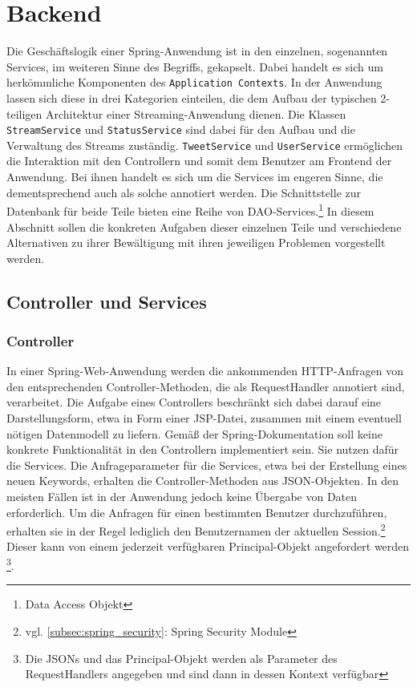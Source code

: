 \section{Backend}

Die Geschäftslogik einer Spring-Anwendung ist in den einzelnen, sogenannten Services, im 
weiteren Sinne des Begriffs, gekapselt. Dabei handelt es sich um herkömmliche Komponenten des 
\texttt{Application Contexts}. In der Anwendung lassen sich diese in drei Kategorien einteilen, 
die dem Aufbau der typischen 2-teiligen Architektur einer Streaming-Anwendung dienen. Die 
Klassen \texttt{StreamService} und \texttt{StatusService} sind dabei für den Aufbau und die 
Verwaltung des Streams zuständig. \texttt{TweetService} und \texttt{UserService} ermöglichen die 
Interaktion mit den Controllern und somit dem Benutzer am Frontend der Anwendung. Bei ihnen 
handelt es sich um die Services im engeren Sinne, die dementsprechend auch als solche annotiert 
werden. Die Schnittstelle zur Datenbank für beide Teile bieten eine Reihe von DAO-Services.\footnote{Data Access Objekt} 
In  diesem Abschnitt sollen die konkreten Aufgaben dieser einzelnen Teile und verschiedene Alternativen zu 
ihrer Bewältigung mit ihren jeweiligen 
Problemen vorgestellt werden.

\subsection{Controller und Services}
\subsubsection*{Controller}
In einer Spring-Web-Anwendung werden die ankommenden HTTP-Anfragen von den entsprechenden 
Controller-Methoden, die als RequestHandler annotiert sind, verarbeitet. Die Aufgabe eines 
Controllers beschränkt sich dabei darauf eine Darstellungsform, etwa in Form einer JSP-Datei, 
zusammen mit einem eventuell nötigen Datenmodell zu liefern. Gemäß der Spring-Dokumentation soll 
keine konkrete Funktionalität in den Controllern implementiert sein. Sie nutzen dafür die Services. 
Die Anfrageparameter für die Services, etwa bei der Erstellung eines neuen Keywords, erhalten die 
Controller-Methoden aus JSON-Objekten. In den meisten Fällen ist in der Anwendung jedoch keine 
Übergabe von Daten erforderlich. Um die Anfragen für einen bestimmten Benutzer durchzuführen, 
erhalten sie in der Regel lediglich den Benutzernamen der aktuellen Session.\footnote{vgl. 
\autoref{subsec:spring_security}: Spring Security Module} Dieser kann von einem jederzeit 
verfügbaren Principal-Objekt angefordert werden \footnote{Die JSONs und das Principal-Objekt werden 
als Parameter des RequestHandlers angegeben und sind dann in dessen Kontext verfügbar}.

